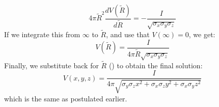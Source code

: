 \begin{equation}
4\pi \tilde{R}^2 \frac{d V(\tilde{R})}{d\tilde{R}} = - \frac{I}{\sqrt{\sigma_x\sigma_y\sigma_z}}
\label{eq:AppAniso:berit2}
\end{equation}
If we integrate this from $\infty$ to $\tilde{R}$, and use that $V(\infty) = 0$, we get:
\begin{equation}
V(\tilde{R}) = \frac{I}{4\pi \tilde{R}\sqrt{\sigma_x\sigma_y\sigma_z}}
\label{eq:AppAniso:berit3}
\end{equation}
Finally, we substitute back for $\tilde{R}$ () to obtain the final solution: 
\begin{equation}
V(x,y,z) = \frac{I}{4 \pi \sqrt{\sigma_y\sigma_z x^2 + \sigma_x\sigma_z y^2 + \sigma_x\sigma_y z^2}}
\label{eq:VC:berit3}
\end{equation}
which is the same as  postulated earlier. 